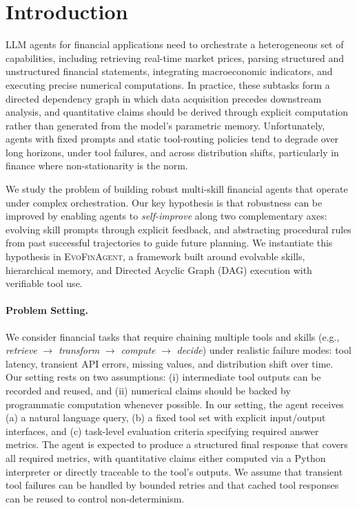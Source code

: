 \documentclass{article}
\begin{document}
\begin{abstract}
\end{abstract}

\section{Introduction}

LLM agents for financial applications need to orchestrate a heterogeneous set of capabilities, including retrieving real-time market prices, parsing structured and unstructured financial statements, integrating macroeconomic indicators, and executing precise numerical computations.
In practice, these subtasks form a directed dependency graph in which data acquisition precedes downstream analysis, and quantitative claims should be derived through explicit computation rather than generated from the model's parametric memory.
Unfortunately, agents with fixed prompts and static tool-routing policies tend to degrade over long horizons, under tool failures, and across distribution shifts, particularly in finance where non-stationarity is the norm.

We study the problem of building robust multi-skill financial agents that operate under complex orchestration. 
Our key hypothesis is that robustness can be improved by enabling agents to \emph{self-improve} along two complementary axes: evolving skill prompts through explicit feedback, and abstracting procedural rules from past successful trajectories to guide future planning. 
We instantiate this hypothesis in \textsc{EvoFinAgent}, a framework built around evolvable skills, hierarchical memory, and Directed Acyclic Graph (DAG) execution with verifiable tool use.

\paragraph{Problem Setting.}
We consider financial tasks that require chaining multiple tools and skills (e.g., \emph{retrieve} $\rightarrow$ \emph{transform} $\rightarrow$ \emph{compute} $\rightarrow$ \emph{decide}) under realistic failure modes: tool latency, transient API errors, missing values, and distribution shift over time. 
Our setting rests on two assumptions: (i) intermediate tool outputs can be recorded and reused, and (ii) numerical claims should be backed by programmatic computation whenever possible.
In our setting, the agent receives (a) a natural language query, (b) a fixed tool set with explicit input/output interfaces, and (c) task-level evaluation criteria specifying required answer metrics. 
The agent is expected to produce a structured final response that covers all required metrics, with quantitative claims either computed via a Python interpreter or directly traceable to the tool's outputs. 
We assume that transient tool failures can be handled by bounded retries and that cached tool responses can be reused to control non-determinism.
\end{document}
